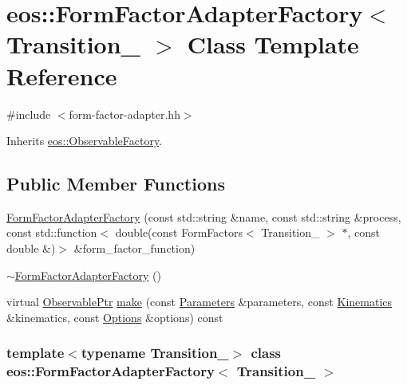 \hypertarget{classeos_1_1FormFactorAdapterFactory}{
\section{eos::FormFactorAdapterFactory$<$ Transition\_\- $>$ Class Template Reference}
\label{classeos_1_1FormFactorAdapterFactory}
}


{\ttfamily \#include $<$form-\/factor-\/adapter.hh$>$}

Inherits \hyperlink{classeos_1_1ObservableFactory}{eos::ObservableFactory}.\subsection*{Public Member Functions}
\begin{DoxyCompactItemize}
\item 
\hyperlink{classeos_1_1FormFactorAdapterFactory_ab337ad383b3c13c698224e400be9f84d}{FormFactorAdapterFactory} (const std::string \&name, const std::string \&process, const std::function$<$ double(const FormFactors$<$ Transition\_\- $>$ $\ast$, const double \&)$>$ \&form\_\-factor\_\-function)
\item 
\hyperlink{classeos_1_1FormFactorAdapterFactory_a6d1b1046b3e7651e0d899dcac8fb8e3c}{$\sim$FormFactorAdapterFactory} ()
\item 
virtual \hyperlink{namespaceeos_a470e5dd806bd129080f1aa0c2954646f}{ObservablePtr} \hyperlink{classeos_1_1FormFactorAdapterFactory_a87734f36d23509771fab23e13ed60ff3}{make} (const \hyperlink{classeos_1_1Parameters}{Parameters} \&parameters, const \hyperlink{classeos_1_1Kinematics}{Kinematics} \&kinematics, const \hyperlink{classeos_1_1Options}{Options} \&options) const 
\end{DoxyCompactItemize}
\subsubsection*{template$<$typename Transition\_\-$>$ class eos::FormFactorAdapterFactory$<$ Transition\_\- $>$}



